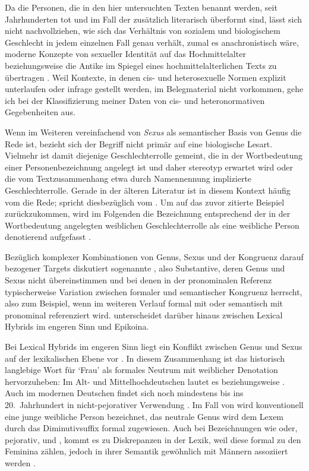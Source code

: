 Da die Personen, die in den hier untersuchten Texten benannt werden, seit
Jahrhunderten tot und im Fall der \KC{} zusätzlich literarisch
überformt sind, lässt sich nicht nachvollziehen, wie sich das Verhältnis von
sozialem und biologischem Geschlecht in jedem einzelnen Fall genau verhält,
zumal es anachronistisch wäre, moderne Konzepte von sexueller Identität auf das
Hochmittelalter beziehungsweise die Antike im Spiegel eines
hochmittelalterlichen Texts zu übertragen \autocite[siehe
z.\,B.][]{klinger2002}. Weil Kontexte, in denen cis- und heterosexuelle Normen
explizit unterlaufen oder infrage gestellt werden, im Belegmaterial nicht
vorkommen, gehe ich bei der Klassifizierung meiner Daten von cis- und
heteronormativen Gegebenheiten aus.

Wenn im Weiteren vereinfachend von \textit{Sexus} als semantischer Basis von
Genus die Rede ist, bezieht sich der Begriff nicht primär auf eine biologische
Lesart. Vielmehr ist damit diejenige Geschlechter\-rolle gemeint, die in der
Wortbedeutung einer Personenbezeichnung angelegt ist und daher stereotyp
erwartet wird oder die vom Textzusammenhang etwa durch Namennennung implizierte
Geschlechterrolle. Gerade in der älteren Literatur ist in diesem Kontext häufig
vom  die Rede; \citet[67]{panther2009} spricht
diesbezüglich vom . Um auf das zuvor zitierte Beispiel
zurückzukommen, wird im Folgenden die Bezeichnung  entsprechend der
in der Wortbedeutung angelegten weiblichen Geschlechterrolle als eine weibliche
Person denotierend aufgefasst
\autocite[vgl.][s.\,v.~]{duden-online}.

Bezüglich komplexer Kombinationen von Genus, Sexus und der Kongruenz darauf
bezogener Targets diskutiert \citet[183--184]{corbett1991} sogenannte
, also Substantive, deren Genus und Sexus nicht
übereinstimmen und bei denen in der pronominalen Referenz typischerweise
Variation zwischen formaler und semantischer Kongruenz herrscht, also zum
Beispiel, wenn  im weiteren Verlauf formal mit  oder
semantisch mit  pronominal referenziert wird. \citet{klein2022}
unterscheidet darüber hinaus zwischen Lexical Hybrids im engeren Sinn und
Epikoina.

Bei Lexical Hybrids im engeren Sinn liegt ein Konflikt zwischen Genus und Sexus
auf der lexikalischen Ebene vor \autocite[145]{klein2022}. In diesem
Zusammenhang ist das historisch langlebige Wort für `Frau' als formales Neutrum
mit weiblicher Denotation hervorzuheben: Im Alt- und
Mittelhochdeutschen lautet es  beziehungsweise
. Auch im modernen Deutschen findet sich 
noch mindestens bis ins 20.~Jahrhundert in nicht-pejorativer Verwendung
\autocite[166]{fleischer2012}. Im Fall von  wird konventionell eine
junge weibliche Person bezeichnet, das neutrale Genus wird dem Lexem durch das
Diminutivsuffix  formal zugewiesen. Auch bei Bezeichnungen wie
 oder, pejorativ,  und , kommt es zu
Diskrepanzen in der Lexik, weil diese formal zu den Feminina zählen, jedoch in
ihrer Semantik gewöhnlich mit Männern assoziiert werden
\autocite[vgl.~auch][67--68]{panther2009}.

